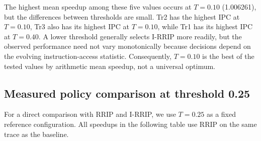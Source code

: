 \begin{table}[H]
\centering\small
\caption{Threshold sensitivity. IPC is reported per trace; speedup and MPKI columns are arithmetic means across the three traces. Speedup is relative to RRIP.}
\end{table}


The highest mean speedup among these five values occurs at $T=0.10$ (1.006261), but the differences between thresholds are small. Tr2 has the highest IPC at $T=0.10$, Tr3 also has its highest IPC at $T=0.10$, while Tr1 has its highest IPC at $T=0.40$. A lower threshold generally selects I-RRIP more readily, but the observed performance need not vary monotonically because decisions depend on the evolving instruction-access statistic. Consequently, $T=0.10$ is the best of the tested values by arithmetic mean speedup, not a universal optimum.

\subsection{Measured policy comparison at threshold 0.25}
For a direct comparison with RRIP and I-RRIP, we use $T=0.25$ as a fixed reference configuration. All speedups in the following table use RRIP on the same trace as the baseline.

